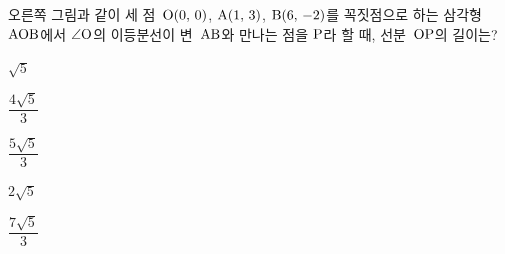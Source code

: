 \noindent\begin{minipage}[t]{0.58\linewidth}\vspace{0pt}\raggedright 오른쪽 그림과 같이 세 점~$\mathrm{O}(0,\mkern3mu 0)$, $\mathrm{A}(1,\mkern3mu 3)$, $\mathrm{B}(6,\mkern3mu -2)$를 꼭짓점으로 하는 삼각형~$\mathrm{AOB}$에서 $\angle\mathrm{O}$의 이등분선이 변~$\mathrm{AB}$와 만나는 점을 $\mathrm{P}$라 할 때, 선분~$\mathrm{OP}$의 길이는?\end{minipage}\hfill\begin{minipage}[t]{0.4\linewidth}\vspace{0pt}\centering \resizebox{\ifdim\width>\linewidth\linewidth\else\width\fi}{!}{}\end{minipage}\par
\begin{choices32}{\rule[-3ex]{0pt}{8ex}$\sqrt{5}$}{\rule[-3ex]{0pt}{8ex}$\dfrac{4\sqrt{5}}{3}$}{\rule[-3ex]{0pt}{8ex}$\dfrac{5\sqrt{5}}{3}$}{\rule[-3ex]{0pt}{8ex}$2\sqrt{5}$}{\rule[-3ex]{0pt}{8ex}$\dfrac{7\sqrt{5}}{3}$}\end{choices32}
